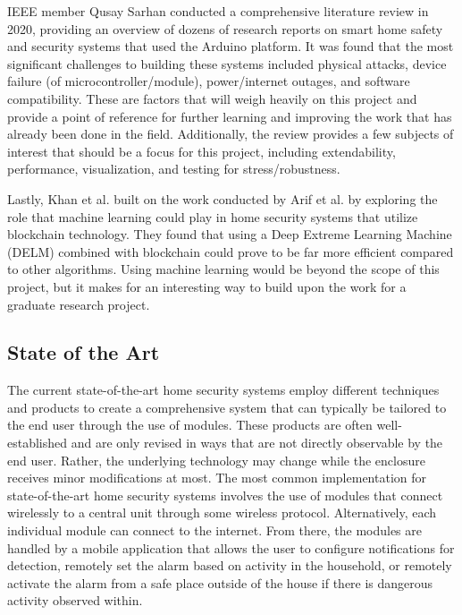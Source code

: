 \documentclass[conference]{IEEEtran}
\begin{document}
IEEE member Qusay Sarhan conducted a comprehensive literature review in 2020, providing
an overview of dozens of research reports on smart home safety and security systems that
used the Arduino platform. It was found that the most significant challenges to building
these systems included physical attacks, device failure (of microcontroller/module),
power/internet outages, and software compatibility.\cite{sarhan2020} These are factors that will weigh
heavily on this project and provide a point of reference for further learning and
improving the work that has already been done in the field. Additionally, the review
provides a few subjects of interest that should be a focus for this project, including
extendability, performance, visualization, and testing for stress/robustness.\cite{sarhan2020}

Lastly, Khan et al. built on the work conducted by Arif et al. by exploring the role that
machine learning could play in home security systems that utilize blockchain technology.
They found that using a Deep Extreme Learning Machine (DELM) combined with
blockchain could prove to be far more efficient compared to other
algorithms.\cite{khanEtAl2021} Using machine learning would be beyond the scope of this project,
but it makes for an interesting way to build upon the work for a graduate research project.

\subsection{State of the Art}

The current state-of-the-art home security systems employ different techniques and
products to create a comprehensive system that can typically be tailored to the end
user through the use of modules. These products are often well-established and are only
revised in ways that are not directly observable by the end user. Rather, the underlying
technology may change while the enclosure receives minor modifications at most.\cite{sarhan2020}
The most common implementation for state-of-the-art home security systems involves the
use of modules that connect wirelessly to a central unit through some wireless protocol.\cite{joseMalekian2017}
Alternatively, each individual module can connect to the internet.\cite{sarhan2020}
From there, the modules are handled by a mobile application that allows the user to
configure notifications for detection, remotely set the alarm based on activity in
the household, or remotely activate the alarm from a safe place outside of the house
if there is dangerous activity observed within.\cite{joseMalekian2017}
\end{document}
